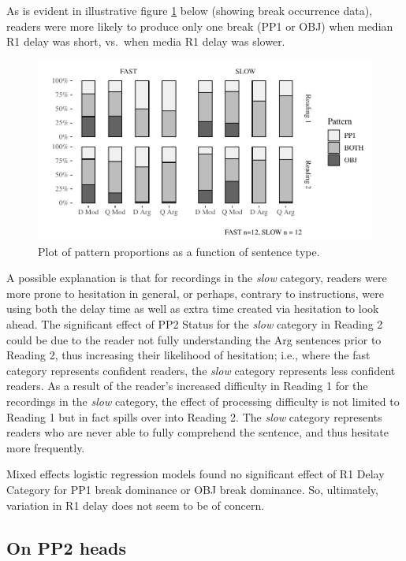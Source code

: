 \documentclass[11pt,oneside]{book}
\begin{document}
As is evident in illustrative figure \ref{fig:facet} below (showing break occurrence data), readers were more likely to produce only one break (PP1 or OBJ) when median R1 delay was short, vs.~when media R1 delay was slower.

\begin{figure}
\centering
\includegraphics{4-results_files/figure-latex/facet-1.pdf}
\caption{\label{fig:facet}Plot of pattern proportions as a function of sentence type.}
\end{figure}

A possible explanation is that for recordings in the \emph{slow} category, readers were more prone to hesitation in general, or perhaps, contrary to instructions, were using both the delay time as well as extra time created via hesitation to look ahead. The significant effect of PP2 Status for the \emph{slow} category in Reading 2 could be due to the reader not fully understanding the Arg sentences prior to Reading 2, thus increasing their likelihood of hesitation; i.e., where the fast category represents confident readers, the \emph{slow} category represents less confident readers. As a result of the reader's increased difficulty in Reading 1 for the recordings in the \emph{slow} category, the effect of processing difficulty is not limited to Reading 1 but in fact spills over into Reading 2. The \emph{slow} category represents readers who are never able to fully comprehend the sentence, and thus hesitate more frequently.

Mixed effects logistic regression models found no significant effect of R1 Delay Category for PP1 break dominance or OBJ break dominance. So, ultimately, variation in R1 delay does not seem to be of concern.

\hypertarget{pp2h}{%
\subsection{On PP2 heads}\label{pp2h}}
\end{document}
